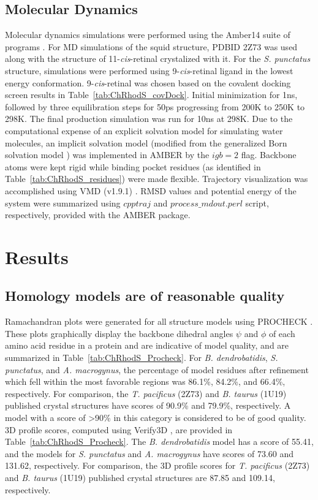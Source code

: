 \subsection*{Molecular Dynamics}
Molecular dynamics simulations were performed using the Amber14 suite of programs \cite{AMBER2015}. For MD simulations of the squid structure, PDBID 2Z73 was used along with the structure of 11-\textit{cis}-retinal crystalized with it. For the \textit{S. punctatus} structure, simulations were performed using 9-\textit{cis}-retinal ligand in the lowest energy conformation. 9-\textit{cis}-retinal was chosen based on the covalent docking screen results in Table~\ref{tab:ChRhodS_covDock}. Initial minimization for 1ns, followed by three equilibration steps for 50ps progressing from 200K to 250K to 298K. The final production simulation was run for 10ns at 298K. Due to the computational expense of an explicit solvation model for simulating water molecules, an implicit solvation model \cite{Onufriev2000} (modified from the generalized Born solvation model \cite{Bashford2000}) was implemented in AMBER by the $igb=2$ flag. Backbone atoms were kept rigid while binding pocket residues (as identified in Table~\ref{tab:ChRhodS_residues}) were made flexible. Trajectory visualization was accomplished using VMD (v1.9.1) \cite{Humphrey1996}. RMSD values and potential energy of the system were summarized using $cpptraj$ and $process\_mdout.perl$ script, respectively, provided with the AMBER package.\\

\section{Results}

\subsection*{Homology models are of reasonable quality}
Ramachandran plots were generated for all structure models using PROCHECK \cite{Laskowski1993,Wiederstein2007}. These plots graphically display the backbone dihedral angles $\psi$ and $\phi$ of each amino acid residue in a protein and are indicative of model quality, and are summarized in Table~\ref{tab:ChRhodS_Procheck}. For \textit{B. dendrobatidis}, \textit{S. punctatus}, and \textit{A. macrogynus}, the percentage of model residues after refinement which fell within the most favorable regions was 86.1\%, 84.2\%, and 66.4\%, respectively. For comparison, the \textit{T. pacificus} (2Z73) and \textit{B. taurus} (1U19) published crystal structures have scores of 90.9\% and 79.9\%, respectively. A model with a score of \textgreater 90\% in this category is considered to be of good quality.\\
\indent 3D profile scores, computed using Verify3D \cite{Luthy1992}, are provided in Table~\ref{tab:ChRhodS_Procheck}. The \textit{B. dendrobatidis} model has a score of 55.41, and the models for \textit{S. punctatus} and \textit{A. macrogynus} have scores of 73.60 and 131.62, respectively. For comparison, the 3D profile scores for \textit{T. pacificus} (2Z73) and \textit{B. taurus} (1U19) published crystal structures are 87.85 and 109.14, respectively.
